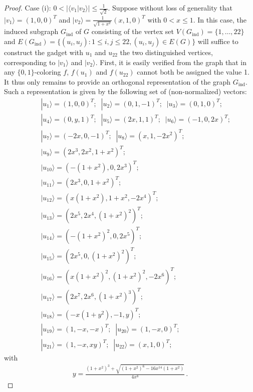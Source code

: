 \documentclass[twocolumn, a4paper, superscriptaddress,nofootinbib, accepted=2020-08-07, hyperref]{quantumarticle}
\begin{document}
\begin{proof}
Case (i): $0 < | \langle v_1 | v_2 \rangle| \leq \frac{1}{\sqrt{2}}$.
	Suppose without loss of generality that $|v_1 \rangle = (1,0,0)^T$ and $|v_{2} \rangle = \frac{1}{\sqrt{1+x^2}}(x,1,0)^T$ with $0 < x \leq 1$.
	In this case, the induced subgraph $G_{\text{ind}}$ of $G$  consisting of the vertex set $V(G_{\text{ind}}) = \{1,\dots,22\}$ and $E(G_{\text{ind}}) = \{(u_i, u_j): 1 \leq i,j \leq 22, (u_i,u_j) \in E(G)\}$ will suffice to construct the gadget with $u_1$ and $u_{22}$ the two distinguished vertices, corresponding to $|v_1 \rangle$ and $|v_2 \rangle$. First, it is easily verified from the graph that in any $\{0,1\}$-coloring $f$,  $f(u_1)$ and $f(u_{22})$ cannot both be assigned the value 1. It thus only remains to provide an orthogonal representation of the graph $G_{\text{ind}}$. Such a representation is given by the following set of (non-normalized) vectors:
	\begin{eqnarray}
	&&|u_1 \rangle = (1,0,0)^T; \; \; |u_2 \rangle = (0,1,-1)^T; \; \; |u_3 \rangle = (0,1,0)^T; \nonumber \\
	&&|u_4 \rangle = (0,y,1)^T; \; \; |u_5 \rangle = (2 x,1,1)^T; \; \; |u_6 \rangle = (-1,0,2 x)^T; \nonumber \\
	&&|u_7 \rangle = (-2 x,0,-1)^T; \; \; |u_8 \rangle = (x,1,-2 x^2)^T; \nonumber \\
	&& |u_9 \rangle = (2x^3, 2 x^2,1+x^2)^T; \nonumber \\
	&& |u_{10} \rangle = (-(1+x^2),0,2x^3)^T; \nonumber \\
	&&|u_{11} \rangle = (2 x^3, 0, 1+x^2)^T; \nonumber\\
	&& |u_{12} \rangle = (x(1+x^2), 1+x^2,-2x^4)^T; \nonumber \\
	&&|u_{13} \rangle = (2 x^5, 2x^4, (1+x^2)^2)^T; \nonumber \\
	&& |u_{14} \rangle = (-(1+x^2)^2, 0, 2x^5)^T; \nonumber \\
	&&|u_{15} \rangle = (2x^5, 0,(1+x^2)^2)^T; \nonumber \\
	&& |u_{16} \rangle = (x(1+x^2)^2, (1+x^2)^2, -2x^6)^T; \nonumber \\
	&&|u_{17} \rangle = (2x^7, 2x^6, (1+x^2)^3)^T; \nonumber \\
	&& |u_{18} \rangle = (-x(1+ y^2), -1, y)^T; \nonumber \\
	&&|u_{19} \rangle = (1,-x,-x)^T; \; \; |u_{20} \rangle = (1,-x,0)^T; \nonumber \\
	&&|u_{21} \rangle = (1,-x,x y)^T; \; \; |u_{22} \rangle = (x,1,0)^T;
	\end{eqnarray}
	with 
	\begin{eqnarray}
	y = \frac{(1+x^2)^3 + \sqrt{(1+x^2)^6 - 16 x^{14} (1+x^2)}}{4 x^8}\,.
	\end{eqnarray}
	

\end{proof}
\end{document}

